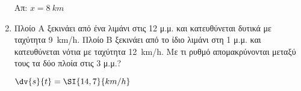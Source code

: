 \begin{enumerate}
		\hfill Απ: $ x = \SI{8}{km} $

	\item Πλοίο Α ξεκινάει από ένα λιμάνι στις 12 μ.μ. και κατευθύνεται δυτικά
		με ταχύτητα  \SI{9}{km/h}. Πλοίο Β ξεκινάει από το ίδιο λιμάνι στη 1
		μ.μ. και κατευθύνεται νότια με ταχύτητα \SI{12}{km/h}. Με τι ρυθμό
		απομακρύνονται μεταξύ τους τα δύο πλοία στις 3 μ.μ.?

		\hfill $ \dv{s}{t} = \SI{14,7}{km/h} $

\end{enumerate}


